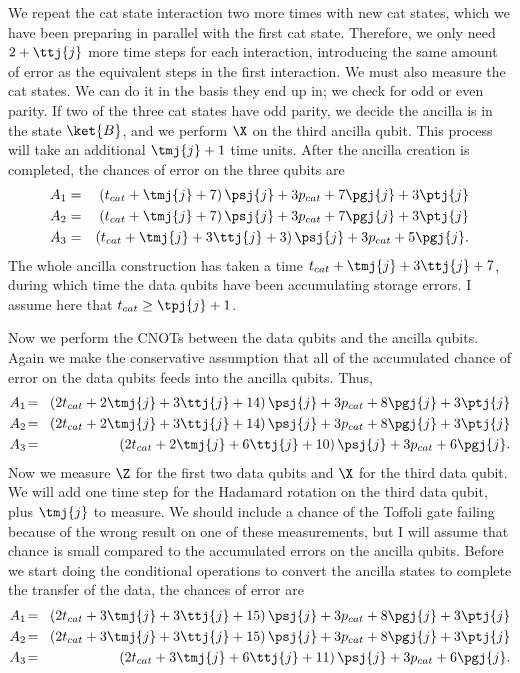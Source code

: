 We repeat the cat state interaction two more times with new cat states,
which we have been preparing in parallel with the first cat state.
Therefore, we only need $2+\ttj{j}$ more time steps for each interaction,
introducing the same amount of error as the equivalent steps in the first
interaction.  We must also measure the cat states.  We can do it in the basis
they end up in; we check for odd or even parity.  If two of the three cat
states have odd parity, we decide the ancilla is in the state $\ket{B}$, and
we perform $\X$ on the third ancilla qubit.  This process will take an
additional $\tmj{j} + 1$ time units.  After the ancilla creation is completed,
the chances of error on the three qubits are
\begin{eqnarray}
	A_1 & = & \left(t_{cat} + \tmj{j} + 7 \right) \psj{j} + 3p_{cat} + 7 \pgj{j} +
	3 \ptj{j} \\
	A_2 & = & \left(t_{cat} + \tmj{j} + 7 \right) \psj{j} + 3p_{cat} + 7 \pgj{j} +
	3 \ptj{j} \\
	A_3 & = & \left(t_{cat} + \tmj{j} + 3 \ttj{j} + 3 \right) \psj{j} + 3p_{cat} +
	5 \pgj{j}.
\end{eqnarray}
The whole ancilla construction has taken a time $t_{cat} + \tmj{j} + 3 \ttj{j}
+ 7$, during which time the data qubits have been accumulating storage
errors.  I assume here that $t_{cat} \geq \tpj{j} + 1$.

Now we perform the CNOTs between the data qubits and the ancilla qubits.
Again we make the conservative assumption that all of the accumulated chance of
error on the data qubits feeds into the ancilla qubits.  Thus,
\begin{eqnarray}
	A_1 & \! = & \! \left(2 t_{cat} + 2 \tmj{j} + 3 \ttj{j} + 14 \right) \psj{j} +
	3 p_{cat} + 8 \pgj{j} + 3 \ptj{j} \\
	A_2 &\!  = & \! \left(2 t_{cat} + 2 \tmj{j} + 3 \ttj{j} + 14 \right) \psj{j} +
	3 p_{cat} + 8 \pgj{j} + 3 \ptj{j} \\
	A_3 & \! = & \! \left(2 t_{cat} + 2 \tmj{j} + 6 \ttj{j} + 10 \right) \psj{j} +
	3 p_{cat} + 6 \pgj{j}.
\end{eqnarray}
Now we measure $\Z$ for the first two data qubits and $\X$ for the third
data qubit.  We will add one time step for the Hadamard rotation on the third
data qubit, plus $\tmj{j}$ to measure.  We should include a chance of the
Toffoli gate failing because of the wrong result on one of these
measurements, but I will assume that chance is small compared to the
accumulated errors on the ancilla qubits.  Before we start doing the
conditional operations to convert the ancilla states to complete the transfer
of the data, the chances of error are
\begin{eqnarray}
	A_1 & \! = & \! \left(2 t_{cat} + 3 \tmj{j} + 3 \ttj{j} + 15 \right) \psj{j} +
	3 p_{cat} + 8 \pgj{j} + 3 \ptj{j} \\
	A_2 & \! = & \! \left(2 t_{cat} + 3 \tmj{j} + 3 \ttj{j} + 15 \right) \psj{j} +
	3 p_{cat} + 8 \pgj{j} + 3 \ptj{j} \\
	A_3 & \! = & \! \left(2 t_{cat} + 3 \tmj{j} + 6 \ttj{j} + 11 \right) \psj{j} +
	3 p_{cat} + 6 \pgj{j}.
\end{eqnarray}

